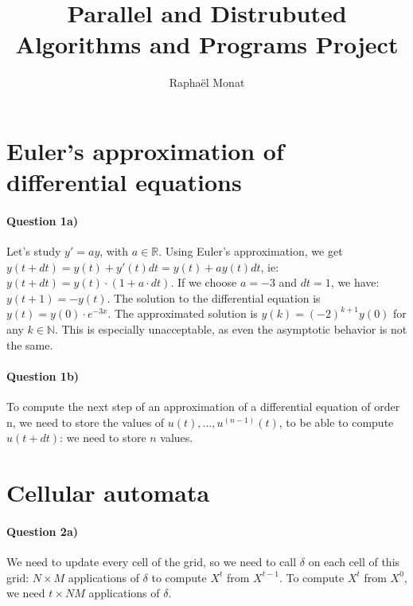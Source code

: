 \documentclass[a4paper,12pt]{article}
\title{Parallel and Distrubuted Algorithms and Programs Project}
\author{Raphaël Monat}
\begin{document}
\maketitle

\section{Euler's approximation of differential equations}

\paragraph{Question 1a)}
Let's study $y' = ay$, with $a \in \mathbb{R}$. Using Euler's approximation, we get $y(t + dt) = y(t) + y'(t)dt = y(t) + a y(t) dt$, ie: $y(t + dt) = y(t) \cdot (1 + a \cdot dt)$. If we choose $a = -3$ and $dt = 1$, we have: $y(t+1) = - y(t)$. The solution to the differential equation is $y(t) = y(0) \cdot e^{-3x}$. The approximated solution is $y(k) = (-2)^{k+1}y(0)$ for any $k \in \mathbb{N}$. This is especially unacceptable, as even the asymptotic behavior is not the same.

\paragraph{Question 1b)} To compute the next step of an approximation of a differential equation of order n, we need to store the values of $u(t), ..., u^{(n-1)}(t)$, to be able to compute $u(t+dt)$: we need to store $n$ values.

\section{Cellular automata}

\paragraph{Question 2a)} We need to update every cell of the grid, so we need to call $\delta$ on each cell of this grid: $N \times M$ applications of $\delta$ to compute $X^t$ from $X^{t-1}$. To compute $X^t$ from $X^0$, we need $t \times NM$ applications of $\delta$.
\end{document}
